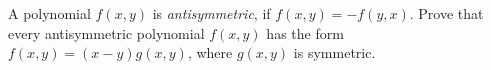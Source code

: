A polynomial $f(x, y)$ is \emph{antisymmetric}, if $f(x, y) = -f(y, x)$. Prove that every antisymmetric polynomial $f(x, y)$ has the form $f(x, y) = (x - y)g(x, y)$, where $g(x, y)$ is symmetric.
